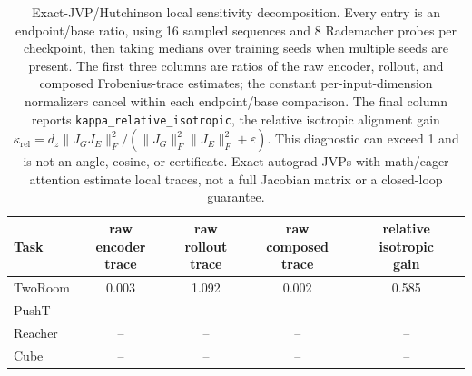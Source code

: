 \begin{table}[H]
\centering
\caption{Exact-JVP/Hutchinson local sensitivity decomposition. Every entry is an endpoint/base ratio, using 16 sampled sequences and 8 Rademacher probes per checkpoint, then taking medians over training seeds when multiple seeds are present. The first three columns are ratios of the raw encoder, rollout, and composed Frobenius-trace estimates; the constant per-input-dimension normalizers cancel within each endpoint/base comparison. The final column reports \texttt{kappa\_relative\_isotropic}, the relative isotropic alignment gain $\kappa_{\mathrm{rel}}=d_z\lVert J_GJ_E\rVert_F^2/(\lVert J_G\rVert_F^2\lVert J_E\rVert_F^2+\varepsilon)$. This diagnostic can exceed 1 and is not an angle, cosine, or certificate. Exact autograd JVPs with math/eager attention estimate local traces, not a full Jacobian matrix or a closed-loop guarantee.}
\label{tab:jvp-hutchinson-sensitivity-audit}
\small
\setlength{\tabcolsep}{3.5pt}
\begin{tabular}{lcccc}
\toprule
Task & \shortstack{raw encoder\\trace} & \shortstack{raw rollout\\trace} & \shortstack{raw composed\\trace} & \shortstack{relative isotropic\\gain} \\
\midrule
TwoRoom & 0.003 & 1.092 & 0.002 & 0.585 \\
PushT & -- & -- & -- & -- \\
Reacher & -- & -- & -- & -- \\
Cube & -- & -- & -- & -- \\
\bottomrule
\end{tabular}
\end{table}
